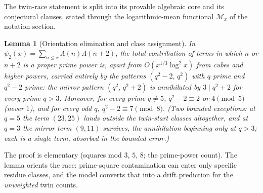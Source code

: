 \documentclass[11pt]{article}
\newtheorem{lemma}{Lemma}
\theoremstyle{definition}
\newcommand{\M}{\mathcal M}
\begin{document}
The twin-race statement is split into its provable algebraic core and
its conjectural clauses, stated through the logarithmic-mean
functional $\M_x$ of the notation section.

\begin{lemma}[Orientation elimination and class assignment]\label{l:c21}
In $\psi_2(x)=\sum_{n\le x}\Lambda(n)\Lambda(n+2)$, the total
contribution of terms in which $n$ or $n+2$ is a proper prime power
is, apart from $O(x^{1/3}\log^2 x)$ from cubes and higher powers,
carried entirely by the patterns $(q^2-2,\,q^2)$ with $q$ prime and
$q^2-2$ prime: the mirror pattern $(q^2,\,q^2+2)$ is annihilated by
$3\mid q^2+2$ for every prime $q>3$.  Moreover, for every prime
$q\neq5$, $q^2-2\equiv2$ or $4\pmod 5$ (never $1$), and for every odd
$q$, $q^2-2\equiv7\pmod8$.  (Two bounded exceptions: at $q=5$ the term $(23,25)$ lands outside the twin-start classes altogether, and at $q=3$ the mirror term $(9,11)$ survives, the annihilation beginning only at $q>3$; each is a single term, absorbed in the bounded error.)
\end{lemma}

The proof is elementary (squares mod $3$, $5$, $8$; the prime-power
count).  The lemma orients the race: prime-square contamination can
enter only specific residue classes, and the model converts that into
a drift prediction for the \emph{unweighted} twin counts.
\end{document}
